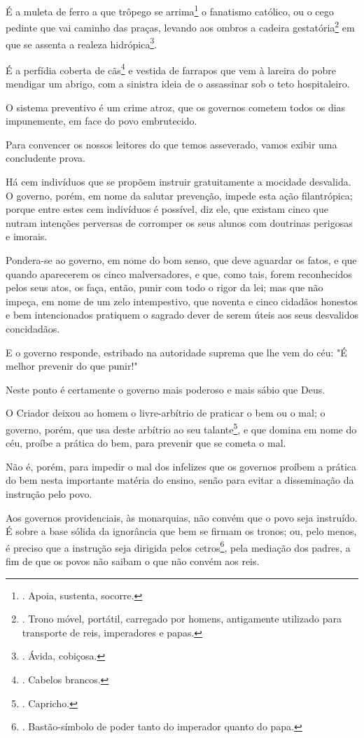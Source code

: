 É a muleta de ferro a que trôpego se arrima\footnote{. Apoia, sustenta,
  socorre.} o fanatismo católico, ou o cego pedinte que vai caminho das
praças, levando aos ombros a cadeira gestatória\footnote{. Trono móvel,
  portátil, carregado por homens, antigamente utilizado para transporte
  de reis, imperadores e papas.} em que se assenta a realeza
hidrópica\footnote{. Ávida, cobiçosa.}.

É a perfídia coberta de cãs\footnote{. Cabelos brancos.} e vestida de
farrapos que vem à lareira do pobre mendigar um abrigo, com a sinistra
ideia de o assassinar sob o teto hospitaleiro.

O sistema preventivo é um crime atroz, que os governos cometem todos os
dias impunemente, em face do povo embrutecido.

Para convencer os nossos leitores do que temos asseverado, vamos exibir
uma concludente prova.

Há cem indivíduos que se propõem instruir gratuitamente a mocidade
desvalida. O governo, porém, em nome da salutar prevenção, impede esta
ação filantrópica; porque entre estes cem indivíduos é possível, diz
ele, que existam cinco que nutram intenções perversas de corromper os
seus alunos com doutrinas perigosas e imorais.

Pondera-se ao governo, em nome do bom senso, que deve aguardar os fatos,
e que quando aparecerem os cinco malversadores, e que, como tais, forem
reconhecidos pelos seus atos, os faça, então, punir com todo o rigor da
lei; mas que não impeça, em nome de um zelo intempestivo, que noventa e
cinco cidadãos honestos e bem intencionados pratiquem o sagrado dever de
serem úteis aos seus desvalidos concidadãos.

E o governo responde, estribado na autoridade suprema que lhe vem do
céu: "É melhor prevenir do que punir!"

Neste ponto é certamente o governo mais poderoso e mais sábio que Deus.

O Criador deixou ao homem o livre-arbítrio de praticar o bem ou o mal; o
governo, porém, que usa deste arbítrio ao seu talante\footnote{.
  Capricho.}, e que domina em nome do céu, proíbe a prática do bem, para
prevenir que se cometa o mal.

Não é, porém, para impedir o mal dos infelizes que os governos proíbem a
prática do bem nesta importante matéria do ensino, senão para evitar a
disseminação da instrução pelo povo.

Aos governos providenciais, às monarquias, não convém que o povo seja
instruído. É sobre a base sólida da ignorância que bem se firmam os
tronos; ou, pelo menos, é preciso que a instrução seja dirigida pelos
cetros\footnote{. Bastão-símbolo de poder tanto do imperador quanto do
  papa.}, pela mediação dos padres, a fim de que os povos não saibam o
que não convém aos reis.

